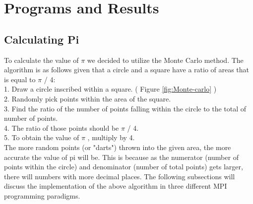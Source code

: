 
\chapter{Programs and Results} %

\label{Chapter 2} %


\section{Calculating Pi }
To calculate the value of $\pi$ we decided to utilize the Monte Carlo method. The algorithm is as follows given that a circle and a square have a ratio of areas that is equal to $\pi$ / 4: \\
1. Draw a circle inscribed within a square. ( Figure \ref{fig:Monte-carlo} )\\
2. Randomly pick points within the area of the square.\\
3. Find the ratio of the number of points falling within the circle to the total of number of points.\\
4. The ratio of those points should be $\pi$ / 4.\\
5. To obtain the value of $\pi$ , multiply by 4.\\

The more random points (or "darts") thrown into the given area, the more accurate the value of pi will be. This is because as the numerator (number of points within the circle) and denominator (number of total points) gets larger, there will numbers with more decimal places. The following subsections will discuss the implementation of the above algorithm in three different MPI programming paradigms.

